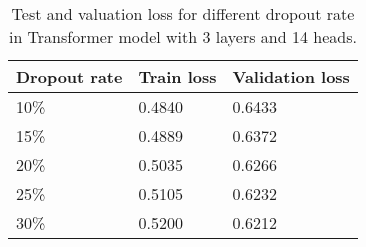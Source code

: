 \begin{table}[]
	\centering
	\begin{tabular}{|l|l|l|}
		\hline
		Dropout rate & Train loss & Validation loss \\ \hline
		10\%         & 0.4840    & 0.6433                \\ \hline
		15\%         & 0.4889    & 0.6372                \\ \hline
		20\%         & 0.5035    & 0.6266                \\ \hline
		25\%         & 0.5105    & 0.6232                \\ \hline
		30\%         & 0.5200    & 0.6212                \\ \hline 
	\end{tabular}
	\caption{Test and valuation loss for different dropout rate in Transformer model with 3 layers and 14 heads.}
	\label{tab:transformer_dropout}
\end{table}